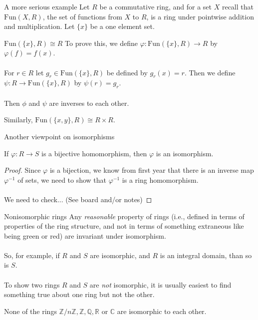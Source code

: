 \documentclass{beamer}
\newcommand{\C}{\mathbb{C}}
\newcommand{\Z}{\mathbb{Z}}
\newcommand{\Q}{\mathbb{Q}}
\newcommand{\R}{\mathbb{R}}
\begin{document}
\begin{frame}{A more serious example}
  Let $R$ be a commutative ring, and for a set $X$ recall that $\text{Fun}(X,R)$, the set of functions from $X$ to $R$, is a ring under pointwise addition and multiplication.  Let $\{x\}$ be a one element set.

  \begin{block}{$\text{Fun}(\{x\}, R)\cong R$} To prove this, we define $\varphi:\text{Fun}(\{x\}, R)\to R$ by $\varphi(f)=f(x)$. \\~\\

    For $r\in R$ let $g_r\in\text{Fun}(\{x\}, R)$ be defined by $g_r(x)=r$. Then we define $\psi:R\to\text{Fun}(\{x\}, R)$ by $\psi(r)=g_r$. \\~\\

    Then $\phi$ and $\psi$ are inverses to each other.
    \end{block}
  
Similarly, $\text{Fun}(\{x,y\},R)\cong R\times R$.
  \end{frame}

\begin{frame}{Another viewpoint on isomorphisms}
  \begin{lemma} If $\varphi:R\to S$ is a bijective homomorphism, then $\varphi$ is an isomorphism.
  \end{lemma}

  \begin{proof} Since $\varphi$ is a bijection, we know from first year that there is an inverse map $\varphi^{-1}$ of sets, we need to show that $\varphi^{-1}$ is a ring homomorphism.  \\~\\

    We need to check... (See board and/or notes)

 \end{proof}
  
\end{frame}

\begin{frame}{Nonisomorphic rings}
  Any \emph{reasonable} property of rings (i.e., defined in terms of properties of the ring structure, and not in terms of something extraneous like being {\color{green}green} or {\color{red}red}) are invariant under isomorphism.
\\~\\
So, for example, if $R$ and $S$ are isomorphic, and $R$ is an integral domain, than so is $S$.
\\~\\
To show two rings $R$ and $S$ are \emph{not} isomorphic, it is usually easiest to find something true about one ring but not the other.


\begin{lemma} None of the rings $\Z/n\Z, \Z, \Q,\R$ or $\C$ are isomorphic to each other. \end{lemma}
  \end{frame}
\end{document}
